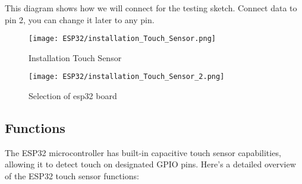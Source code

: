 This diagram shows how we will connect for the testing sketch. Connect data to pin 2, you can change it later to any pin.

\begin{figure}  
	\begin{center}
		\texttt{[image: ESP32/installation\_Touch\_Sensor.png]}
		\caption{Installation Touch Sensor} 
		\label{fig:Python 3.10.}
	\end{center}
\end{figure}	



\begin{figure}  
	\begin{center}
		\texttt{[image: ESP32/installation\_Touch\_Sensor\_2.png]}
		\caption{Selection of esp32 board} 
		\label{fig:Python 3.10.}
	\end{center}
\end{figure}	

\subsection{Functions}
The ESP32 microcontroller has built-in capacitive touch sensor capabilities, allowing it to detect touch on designated GPIO pins. Here’s a detailed overview of the ESP32 touch sensor functions:

